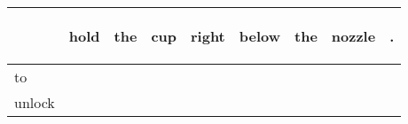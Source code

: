 \documentclass[landscape]{article}
\newcommand{\ssp}{\hspace{2pt}}
\begin{document}
\noindent\begin{tabular}{|l|p{10pt}|p{10pt}|p{10pt}|p{10pt}|p{10pt}|p{10pt}|p{10pt}|p{10pt}|}
\hline
&\begin{sideways}\cellcolor{ref0}hold\hspace{12pt}\end{sideways}&\begin{sideways}\cellcolor{ref1}the\hspace{12pt}\end{sideways}&\begin{sideways}\cellcolor{ref2}cup\hspace{12pt}\end{sideways}&\begin{sideways}\cellcolor{ref3}right\hspace{12pt}\end{sideways}&\begin{sideways}\cellcolor{ref4}below\hspace{12pt}\end{sideways}&\begin{sideways}\cellcolor{ref5}the\hspace{12pt}\end{sideways}&\begin{sideways}\cellcolor{ref6}nozzle\hspace{12pt}\end{sideways}&\begin{sideways}\cellcolor{ref7}.\hspace{12pt}\end{sideways}\\
\hline
\ssp to \ssp&\hspace{2pt}&\hspace{2pt}&\hspace{2pt}&\hspace{2pt}&\hspace{2pt}&\hspace{2pt}&\hspace{2pt}&\hspace{2pt}\\
\hline
\ssp unlock \ssp&\hspace{2pt}&\hspace{2pt}&\hspace{2pt}&\hspace{2pt}&\hspace{2pt}&\hspace{2pt}&\hspace{2pt}&\hspace{2pt}\\

\end{tabular}
\end{document}
